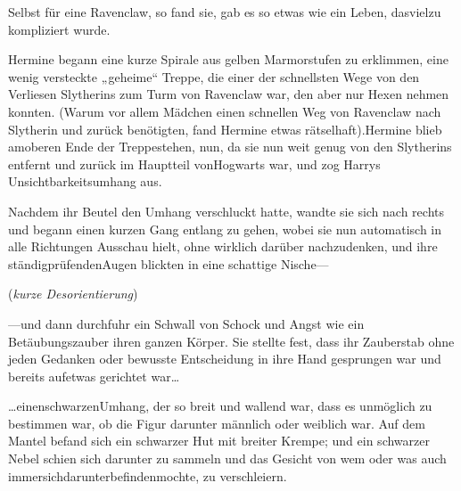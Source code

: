 Selbst für eine Ravenclaw, so fand sie, gab es so etwas wie ein Leben, dasvielzu kompliziert wurde.

Hermine begann eine kurze Spirale aus gelben Marmorstufen zu erklimmen, eine wenig versteckte „geheime“ Treppe, die einer der schnellsten Wege von den Verliesen Slytherins zum Turm von Ravenclaw war, den aber nur Hexen nehmen konnten. (Warum vor allem Mädchen einen schnellen Weg von Ravenclaw nach Slytherin und zurück benötigten, fand Hermine etwas rätselhaft).Hermine blieb amoberen Ende der Treppestehen, nun, da sie nun weit genug von den Slytherins entfernt und zurück im Hauptteil vonHogwarts war, und zog Harrys Unsichtbarkeitsumhang aus.

Nachdem ihr Beutel den Umhang verschluckt hatte, wandte sie sich nach rechts und begann einen kurzen Gang entlang zu gehen, wobei sie nun automatisch in alle Richtungen Ausschau hielt, ohne wirklich darüber nachzudenken, und ihre ständigprüfendenAugen blickten in eine schattige Nische—

(\emph{kurze Desorientierung})

—und dann durchfuhr ein Schwall von Schock und Angst wie ein Betäubungszauber ihren ganzen Körper. Sie stellte fest, dass ihr Zauberstab ohne jeden Gedanken oder bewusste Entscheidung in ihre Hand gesprungen war und bereits aufetwas gerichtet war…

…einenschwarzenUmhang, der so breit und wallend war, dass es unmöglich zu bestimmen war, ob die Figur darunter männlich oder weiblich war. Auf dem Mantel befand sich ein schwarzer Hut mit breiter Krempe; und ein schwarzer Nebel schien sich darunter zu sammeln und das Gesicht von wem oder was auch immersichdarunterbefindenmochte, zu verschleiern.

